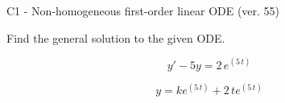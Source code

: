 \begin{exercise}
  \begin{exerciseTitle}C1 - Non-homogeneous first-order linear ODE (ver. 55)\end{exerciseTitle}
  \begin{exerciseStatement}
    
Find the general solution to the given ODE.

    
\[y'-5y= 2 \, e^{\left(5 \, t\right)}\]

  \end{exerciseStatement}
  \begin{exerciseAnswer}
    
\[y= k e^{\left(5 \, t\right)} + 2 \, t e^{\left(5 \, t\right)}\]

  \end{exerciseAnswer}
\end{exercise}